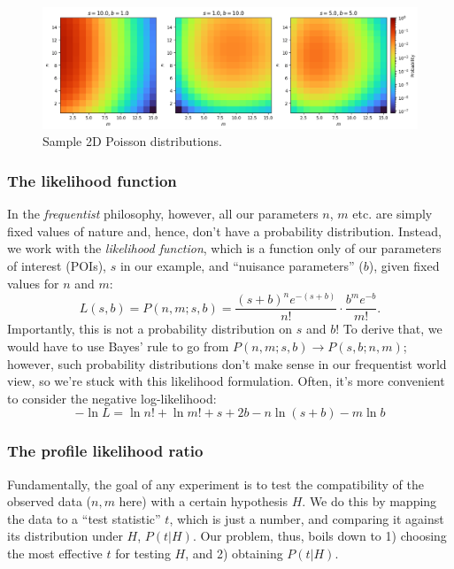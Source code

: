 \begin{figure}[htb]
    \centering
    \captionsetup{justification=centering}
    \includegraphics[width=\textwidth]{figures/03-Stats/01-intro/1.png}
    \caption{Sample 2D Poisson distributions.}
    \label{fig:03_pois}
\end{figure}

\subsubsection{The likelihood function}

In the \textit{frequentist} philosophy, however, all our parameters $n$, $m$ etc. are simply fixed values of nature and, hence, don't have a probability distribution.
Instead, we work with the \textit{likelihood function}, which is a function only of our parameters of interest (POIs), $s$ in our example, and ``nuisance parameters'' ($b$), given fixed values for $n$ and $m$:
\begin{equation}
\label{eq:03_likelihood}
L(s, b) = P(n, m; s, b) = \frac{(s+b)^n e^{-(s+b)}}{n!} \cdot \frac{b^m e^{-b}}{m!}.
\end{equation}
Importantly, this is not a probability distribution on $s$ and $b$! To derive that, we would have to use Bayes' rule to go from $P(n, m; s, b) \to P(s, b; n, m)$; however, such probability distributions don't make sense in our frequentist world view, so we're stuck with this likelihood formulation. 
Often, it's more convenient to consider the negative log-likelihood:
\begin{equation}
\label{eq:03_nll}
-\ln L = \ln n! + \ln m! + s + 2b - n\ln(s+b) - m \ln b
\end{equation}

\subsubsection{The profile likelihood ratio}

Fundamentally, the goal of any experiment is to test the compatibility of the observed data ($n, m$ here) with a certain hypothesis $H$.
We do this by mapping the data to a ``test statistic'' $t$, which is just a number, and comparing it against its distribution under $H$, $P(t| H)$.
Our problem, thus, boils down to 1) choosing the most effective $t$ for testing $H$, and 2) obtaining $P(t| H)$.

